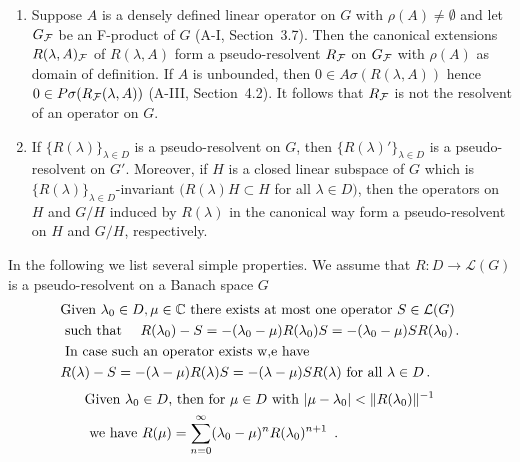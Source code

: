 \begin{example}\label{ex:c3-2.5}
	\begin{enumerate}[\upshape (i), wide, labelindent=.5em]
		\item 
		Suppose $A$ is a densely defined linear operator on $G$ with $\rho(A) \neq \emptyset$ and let $G_{\mathcal{F}}$ be an F-product of $G$ (\cf A-I, Section~3.7).
		Then the canonical extensions $R(\lambda,A)_{\mathcal{F}}$ of $R(\lambda,A)$ form a pseudo-resolvent $R_{\mathcal{F}}$ on $G_{\mathcal{F}}$ with $\rho(A)$ as domain of definition.
		If $A$ is unbounded, then $0 \in A\sigma(R(\lambda,A))$ hence $0 \in P\sigma(R_{\mathcal{F}}(\lambda,A))$ (\cf A-III, Section~4.2).
		It follows that $R_{\mathcal{F}}$ is not the resolvent of an operator on $G$.
		
		\item 
		If $\{R(\lambda)\}_{\lambda\in D}$ is a pseudo-resolvent on $G$, then $\{R(\lambda)'\}_{\lambda\in D}$ is a pseudo-resolvent on $G'$.
		Moreover, if $H$ is a closed linear subspace of $G$ which is $\{R(\lambda)\}_{\lambda\in D}$-invariant $(R(\lambda)H \subset H$ for all $\lambda \in D)$, then the operators on $H$ and $G/H$ induced by $R(\lambda)$ in the canonical way form a pseudo-resolvent on $H$ and $G/H$, respectively.
	\end{enumerate}
\end{example}
In the following we list several simple properties.
We assume that $R \colon D \to \mathcal{L}(G)$ is a pseudo-resolvent on a Banach space $G$
\begin{equation}\label{eq:c3-2.10}
	\begin{aligned}
	&\text{Given  $\lambda_{0} \in D, \mu \in \mathbb{C} $  there exists at most one operator  $S \in \mathcal{L}(G)$ }\\
	&\text{ such that \quad $R(\lambda_{0}) - S = -(\lambda_{0}-\mu)R(\lambda_{0})S = -(\lambda_{0}-\mu)SR(\lambda_{0})$}\,.\\
	&\text{ In case such an operator exists w,e have} \\
	&\text{$R(\lambda) - S = -(\lambda-\mu)R(\lambda)S = -(\lambda-\mu)SR(\lambda)$ for all $\lambda \in D$}\,.
	\end{aligned}
\end{equation}
\begin{equation}\label{eq:c3-2.11}
	\begin{aligned}
	&\text{Given  $\lambda_{0} \in D$,  then for  $\mu \in D$  with  $|\mu-\lambda_{0}| < \|R(\lambda_{0})\|^{-1}$}\\ 
	&\text{ we have $ R(\mu) = \sum_{n=0}^{\infty} (\lambda_{0}-\mu)^n R(\lambda_{0})^{n+1}$ }\,.
	\end{aligned}
\end{equation}

